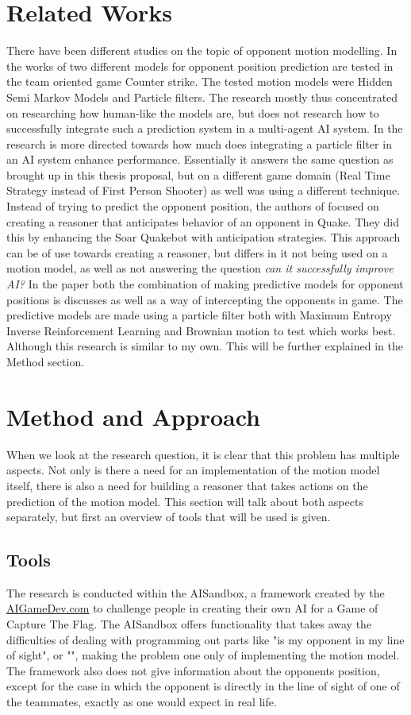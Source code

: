 \documentclass[a4paper, 12pt]{article}
\begin{document}
\section{Related Works}
There have been different studies on the topic of opponent motion modelling.
In the works of \citep{Hladky_anevaluation} two different models for opponent
position prediction are tested in the team oriented game Counter strike. 
The tested motion models were
Hidden Semi Markov Models and Particle filters.
The research mostly thus concentrated on researching how human-like the
models are, but does not research how to successfully integrate such a
prediction system in a multi-agent AI system.
In \citep{weber2011aiide} the research is more directed towards how much does
integrating a particle filter in an AI system enhance performance. Essentially it answers
the same question as brought up in this thesis proposal, but on a different game
domain (Real Time Strategy instead of First Person Shooter) as well was using a
different technique. 
Instead of trying to predict the opponent position, the authors of
\citep{Laird:2001:KYG:375735.376343} focused on creating a reasoner that
anticipates behavior of an opponent in Quake. They did this by enhancing the
Soar Quakebot with anticipation strategies. This approach can be of use towards
creating a reasoner, but differs in it not being used on a motion model, as well
as not answering the question \emph{can it successfully improve AI?}
In the paper \citep{6374144} both the combination of making predictive models
for opponent positions is discusses as well as a way of intercepting the
opponents in game. The predictive models are made using a particle filter both
with Maximum Entropy Inverse Reinforcement Learning and Brownian motion to test
which works best. Although this research is similar to my own. This will be
further explained in the Method section.

\section{Method and Approach}
When we look at the research question, it is clear that this problem has multiple aspects. Not
only is there a need for an implementation of the motion model itself, there is
also a need for building a reasoner that takes actions on the prediction of the
motion model. This section will talk about both aspects separately, but first an
overview of tools that will be used is given.

\subsection{Tools}
The research is conducted within the AISandbox, a framework created by the
\url{AIGameDev.com} to challenge people in creating their own AI for a Game of
Capture The Flag. The AISandbox offers functionality that takes away the
difficulties of dealing with programming out parts like "is my opponent in my
line of sight", or "", making the
problem one only of implementing the motion model. The framework also does not
give information about the opponents position, except for the case in which the
opponent is directly in the line of sight of one of the teammates, exactly as
one would expect in real life.
\end{document}

